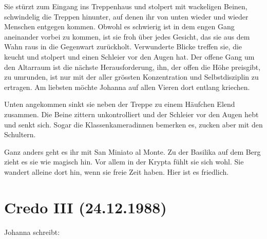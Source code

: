 \documentclass[10pt,titlepage,a5paper]{book}
\begin{document}
Sie stürzt zum Eingang ins Treppenhaus und stolpert mit wackeligen Beinen, schwindelig die Treppen hinunter, auf denen ihr von unten wieder und wieder Menschen entgegen kommen. Obwohl es schwierig ist in dem engen Gang aneinander vorbei zu kommen, ist sie froh über jedes Gesicht, das sie aus dem Wahn raus in die Gegenwart zurückholt. Verwunderte Blicke treffen sie, die keucht und stolpert und einen Schleier vor den Augen hat. Der offene Gang um den Altarraum ist die nächste Herausforderung, ihn, der offen die Höhe preisgibt, zu umrunden, ist nur mit der aller grössten Konzentration und Selbstdisziplin zu ertragen. Am liebsten möchte Johanna auf allen Vieren  dort entlang kriechen.

Unten angekommen sinkt sie neben der Treppe zu einem Häufchen Elend zusammen. Die Beine zittern unkontrolliert und der Schleier vor den Augen hebt und senkt sich. Sogar die Klassenkameradinnen bemerken es, zucken aber mit den Schultern.

Ganz anders geht es ihr mit San Miniato al Monte. Zu der Basilika auf dem Berg zieht es sie wie magisch hin. Vor allem in der Krypta fühlt sie sich wohl. Sie wandert alleine dort hin, wenn sie freie Zeit haben. Hier ist es friedlich.



\section*{Credo III (24.12.1988)}

Johanna schreibt:
\end{document}
